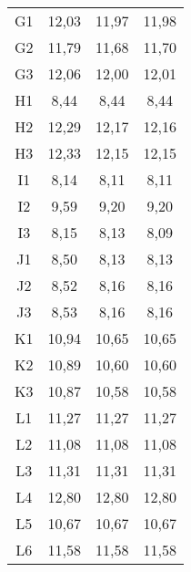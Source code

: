 \begin{center}
\begin{longtable}{cccc}
G1    & 12,03 & 11,97 & 11,98 \\
G2    & 11,79 & 11,68 & 11,70 \\
G3    & 12,06 & 12,00 & 12,01 \\
H1    & 8,44  & 8,44  & 8,44 \\
H2    & 12,29 & 12,17 & 12,16 \\
H3    & 12,33 & 12,15 & 12,15 \\
I1    & 8,14  & 8,11  & 8,11 \\
I2    & 9,59  & 9,20  & 9,20 \\
I3    & 8,15  & 8,13  & 8,09 \\
J1    & 8,50  & 8,13  & 8,13 \\
J2    & 8,52  & 8,16  & 8,16 \\
J3    & 8,53  & 8,16  & 8,16 \\
K1    & 10,94 & 10,65 & 10,65 \\
K2    & 10,89 & 10,60 & 10,60 \\
K3    & 10,87 & 10,58 & 10,58 \\
L1    & 11,27 & 11,27 & 11,27 \\
L2    & 11,08 & 11,08 & 11,08 \\
L3    & 11,31 & 11,31 & 11,31 \\
L4    & 12,80 & 12,80 & 12,80 \\
L5    & 10,67 & 10,67 & 10,67 \\
L6    & 11,58 & 11,58 & 11,58 \\

\end{longtable}
\end{center}

